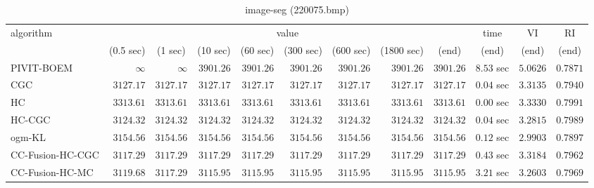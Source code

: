 \begin{table}[H]
\scriptsize
\centering
\caption{image-seg (220075.bmp)}
\label{tab:anytimetable-image-seg-220075.bmp}
\begin{tabular}{lrrrrrrrrrrr}
\toprule
           algorithm &                                   \multicolumn{8}{c}{value} & \multicolumn{1}{c}{time}    & \multicolumn{1}{c}{VI}  & \multicolumn{1}{c}{RI} \\  
\cmidrule(lr){2-9}\cmidrule(lr){10-10} \cmidrule(lr){11-11} \cmidrule(lr){12-12}   
                     & \multicolumn{1}{c}{(0.5 sec)} & \multicolumn{1}{c}{(1 sec)} & \multicolumn{1}{c}{(10 sec)} & \multicolumn{1}{c}{(60 sec)} & \multicolumn{1}{c}{(300 sec)} & \multicolumn{1}{c}{(600 sec)} & \multicolumn{1}{c}{(1800 sec)} & \multicolumn{1}{c}{(end)} & \multicolumn{1}{c}{(end)}    & \multicolumn{1}{c}{(end)}   & \multicolumn{1}{c}{(end)}  \\ \midrule 
          PIVIT-BOEM & $\infty$ & $\infty$ & $      3901.26$ & $      3901.26$ & $      3901.26$ & $      3901.26$ & $      3901.26$ & $      3901.26$ & $         8.53$ sec    & $       5.0626$  & $       0.7871$ \\ 
                 CGC & $      3127.17$ & $      3127.17$ & $      3127.17$ & $      3127.17$ & $      3127.17$ & $      3127.17$ & $      3127.17$ & $      3127.17$ & $         0.04$ sec    & $       3.3135$  & $       0.7940$ \\ 
                  HC & $      3313.61$ & $      3313.61$ & $      3313.61$ & $      3313.61$ & $      3313.61$ & $      3313.61$ & $      3313.61$ & $      3313.61$ & $         0.00$ sec    & $       3.3330$  & $       0.7991$ \\ 
              HC-CGC & $      3124.32$ & $      3124.32$ & $      3124.32$ & $      3124.32$ & $      3124.32$ & $      3124.32$ & $      3124.32$ & $      3124.32$ & $         0.04$ sec    & $       3.2815$  & $       0.7989$ \\ 
              ogm-KL & $      3154.56$ & $      3154.56$ & $      3154.56$ & $      3154.56$ & $      3154.56$ & $      3154.56$ & $      3154.56$ & $      3154.56$ & $         0.12$ sec    & $       2.9903$  & $       0.7897$ \\ 
    CC-Fusion-HC-CGC & $      3117.29$ & $      3117.29$ & $      3117.29$ & $      3117.29$ & $      3117.29$ & $      3117.29$ & $      3117.29$ & $      3117.29$ & $         0.43$ sec    & $       3.3184$  & $       0.7962$ \\ 
     CC-Fusion-HC-MC & $      3119.68$ & $      3117.29$ & $      3115.95$ & $      3115.95$ & $      3115.95$ & $      3115.95$ & $      3115.95$ & $      3115.95$ & $         3.21$ sec    & $       3.2603$  & $       0.7969$ \\ 

\end{tabular}
\end{table}
